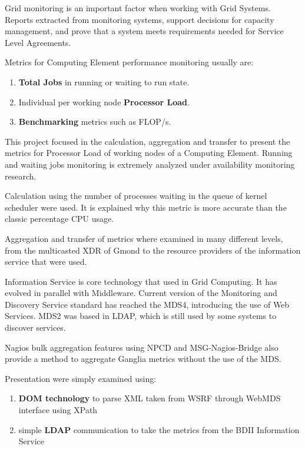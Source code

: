 
Grid monitoring is an important factor when working with Grid Systems. Reports extracted from monitoring systems, support decisions for capacity management, and prove that a system meets requirements needed for Service Level Agreements.

Metrics for Computing Element performance monitoring usually are:

\begin{enumerate}
 \item {\bf Total Jobs} in running or waiting to run state.
 \item Individual per working node {\bf Processor Load}.
 \item {\bf Benchmarking} metrics such as FLOP/s.
\end{enumerate}

This project focused in the calculation, aggregation and transfer to present the metrics for Processor Load of working nodes of a Computing Element. Running and waiting jobs monitoring is extremely analyzed under availability monitoring research.

Calculation using the number of processes waiting in the queue of kernel scheduler were used. It is explained why this metric is more accurate than the classic percentage CPU usage.

Aggregation and transfer of metrics where examined in many different levels, from the multicasted XDR of Gmond to the resource providers of the information service that were used.

Information Service is core technology that used in Grid Computing. It has evolved in parallel with Middleware. Current version of the Monitoring and Discovery Service standard has reached the MDS4, introducing the use of Web Services. MDS2 was based in LDAP, which is still used by some systems to discover services.

Nagios bulk aggregation features using NPCD and MSG-Nagios-Bridge also provide a method to aggregate Ganglia metrics without the use of the MDS.

Presentation were simply examined using:

\begin{enumerate}
 \item {\bf DOM technology} to parse XML taken from WSRF through WebMDS interface using XPath
 \item simple {\bf LDAP} communication to take the metrics from the BDII Information Service
\end{enumerate}

